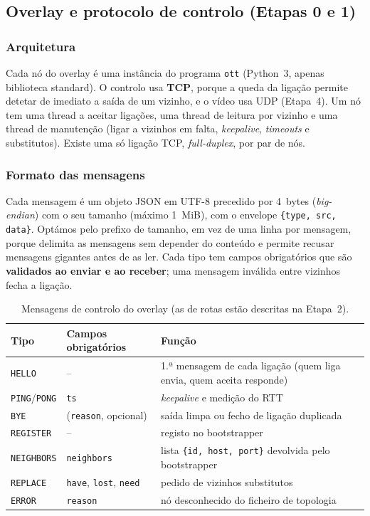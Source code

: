 
\subsection{Overlay e protocolo de controlo (Etapas 0 e 1)}

\subsubsection{Arquitetura}

Cada nó do overlay é uma instância do programa \texttt{ott} (Python~3, apenas biblioteca
standard). O controlo usa \textbf{TCP}, porque a queda da ligação permite detetar de imediato a
saída de um vizinho, e o vídeo usa UDP (Etapa~4). Um nó tem uma thread a aceitar ligações, uma
thread de leitura por vizinho e uma thread de manutenção (ligar a vizinhos em falta, \emph{keepalive},
\emph{timeouts} e substitutos). Existe uma só ligação TCP, \emph{full-duplex}, por par de nós.

\subsubsection{Formato das mensagens}

Cada mensagem é um objeto JSON em UTF-8 precedido por 4~bytes (\emph{big-endian}) com o seu tamanho
(máximo 1~MiB), com o envelope \texttt{\{type, src, data\}}. Optámos pelo prefixo de tamanho, em vez de
uma linha por mensagem, porque delimita as mensagens sem depender do conteúdo e permite recusar
mensagens gigantes antes de as ler. Cada tipo tem campos obrigatórios que são \textbf{validados ao
enviar e ao receber}; uma mensagem inválida entre vizinhos fecha a ligação.

\begin{table}[h]
\centering
\small
\begin{tabular}{l l p{6.2cm}}
\hline
Tipo & Campos obrigatórios & Função \\
\hline
\texttt{HELLO} & -- & 1.ª mensagem de cada ligação (quem liga envia, quem aceita responde) \\
\texttt{PING}/\texttt{PONG} & \texttt{ts} & \emph{keepalive} e medição do RTT \\
\texttt{BYE} & (\texttt{reason}, opcional) & saída limpa ou fecho de ligação duplicada \\
\texttt{REGISTER} & -- & registo no bootstrapper \\
\texttt{NEIGHBORS} & \texttt{neighbors} & lista \texttt{\{id, host, port\}} devolvida pelo bootstrapper \\
\texttt{REPLACE} & \texttt{have}, \texttt{lost}, \texttt{need} & pedido de vizinhos substitutos \\
\texttt{ERROR} & \texttt{reason} & nó desconhecido do ficheiro de topologia \\
\hline
\end{tabular}
\caption{Mensagens de controlo do overlay (as de rotas estão descritas na Etapa~2).}
\end{table}


